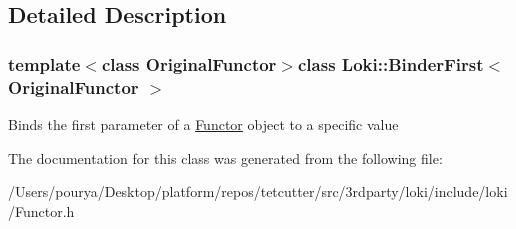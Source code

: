\subsection{Detailed Description}
\subsubsection*{template$<$class Original\+Functor$>$class Loki\+::\+Binder\+First$<$ Original\+Functor $>$}

Binds the first parameter of a \hyperlink{classLoki_1_1Functor}{Functor} object to a specific value 

The documentation for this class was generated from the following file\+:\begin{DoxyCompactItemize}
\item 
/\+Users/pourya/\+Desktop/platform/repos/tetcutter/src/3rdparty/loki/include/loki/Functor.\+h\end{DoxyCompactItemize}
